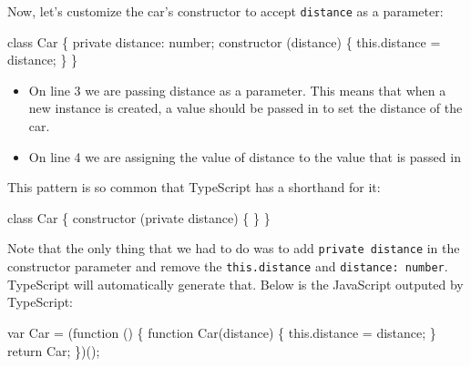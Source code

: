\documentclass[12pt,]{article}
\newenvironment{Shaded}{}{}
\newcommand{\KeywordTok}[1]{\textcolor[rgb]{0.00,0.00,1.00}{{#1}}}
\newcommand{\FunctionTok}[1]{{#1}}
\newcommand{\ControlFlowTok}[1]{\textcolor[rgb]{0.00,0.00,1.00}{{#1}}}
\newcommand{\OperatorTok}[1]{{#1}}
\newcommand{\AttributeTok}[1]{{#1}}
\newcommand{\NormalTok}[1]{{#1}}
\providecommand{\tightlist}{%
  \setlength{\itemsep}{0pt}\setlength{\parskip}{0pt}}
\begin{document}
Now, let's customize the car's constructor to accept \texttt{distance}
as a parameter:

\begin{Shaded}
\begin{Highlighting}[numbers=left,,]
\KeywordTok{class} \NormalTok{Car \{}
  \KeywordTok{private} \NormalTok{distance: number;}
  \FunctionTok{constructor} \NormalTok{(distance) \{}
    \KeywordTok{this}\NormalTok{.}\FunctionTok{distance} \NormalTok{= distance;}
  \NormalTok{\}}
\NormalTok{\}}
\end{Highlighting}
\end{Shaded}

\begin{itemize}
\tightlist
\item
  On line 3 we are passing distance as a parameter. This means that when
  a new instance is created, a value should be passed in to set the
  distance of the car.
\item
  On line 4 we are assigning the value of distance to the value that is
  passed in
\end{itemize}

This pattern is so common that TypeScript has a shorthand for it:

\begin{Shaded}
\begin{Highlighting}[numbers=left,,]
\KeywordTok{class} \NormalTok{Car \{}
  \FunctionTok{constructor} \NormalTok{(}\KeywordTok{private} \NormalTok{distance) \{}
  \NormalTok{\}}
\NormalTok{\}}
\end{Highlighting}
\end{Shaded}

Note that the only thing that we had to do was to add
\texttt{private\ distance} in the constructor parameter and remove the
\texttt{this.distance} and \texttt{distance:\ number}. TypeScript will
automatically generate that. Below is the JavaScript outputed by
TypeScript:

\begin{Shaded}
\begin{Highlighting}[numbers=left,,]
\KeywordTok{var} \NormalTok{Car }\OperatorTok{=} \NormalTok{(}\KeywordTok{function} \NormalTok{() }\OperatorTok{\{}
  \KeywordTok{function} \AttributeTok{Car}\NormalTok{(distance) }\OperatorTok{\{}
    \KeywordTok{this}\NormalTok{.}\AttributeTok{distance} \OperatorTok{=} \NormalTok{distance}\OperatorTok{;}
  \OperatorTok{\}}
  \ControlFlowTok{return} \NormalTok{Car}\OperatorTok{;}
\OperatorTok{\}}\NormalTok{)()}\OperatorTok{;}
\end{Highlighting}
\end{Shaded}
\end{document}
